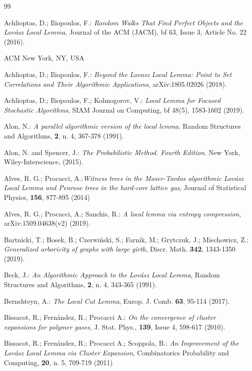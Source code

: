 \documentclass[11pt]{article}
\begin{document}
\begin{thebibliography}{99}


  Achlioptas, D.; Iliopoulos, F.: {\it Random Walks That Find Perfect Objects and the Lovász Local Lemma},
 Journal of the ACM (JACM), {bf 63},  Issue 3, Article No. 22  (2016).

ACM New York, NY, USA


 Achlioptas, D.; Iliopoulos, F.: {\it Beyond the Lovasz Local Lemma: Point to Set Correlations and Their Algorithmic Applications}, arXiv:1805.02026 (2018).

       Achlioptas, D.; Iliopoulos, F.; Kolmogorov, V.: {\it Local Lemma for Focused Stochastic Algorithms},
SIAM Journal on Computing, {bf 48}(5), 1583-1602 (2019).

 Alon, N.: {\it A parallel algorithmic version of the local lemma}. Random Structures and Algorithms,
{\bf 2}, n. 4, 367-378  (1991).

 Alon, N. and Spencer, J.: {\it The Probabilistic Method. Fourth  Edition}. New York, Wiley-Interscience, (2015).


 Alves, R. G.; Procacci, A.:{\it Witness trees in the Moser-Tardos algorithmic Lov\'asz Local Lemma and Penrose trees in the hard-core lattice gas}, Journal of Statistical Physics, {\bf 156}, 877-895 (2014)

 Alves, R. G.; Procacci, A.; Sanchis, R.: \textit{A local lemma via entropy compression}, arXiv:1509.04638(v2) (2019).

 Bartnicki, T.; Bosek, B.; Czerwiński, S.; Farnik, M.; Grytczuk, J.; Miechowicz, Z.: {\it Generalized arboricity of graphs with large girth}, Discr. Math. {\bf 342}, 1343-1350 (2019).

 Beck, J.: {\it An Algorithmic Approach to the Lovász Local Lemma}, Random Structures and Algorithms,
{\bf 2}, n. 4, 343-365 (1991).

 Bernshteyn, A.: {\it The Local Cut Lemma}, Europ. J. Comb. {\bf 63}, 95-114 (2017).


 Bissacot, R.; Fern\'andez, R.; Procacci A.: {\it On the convergence of cluster expansions for polymer gases}, J. Stat. Phys., {\bf 139}, Issue 4, 598-617 (2010).


 Bissacot, R.; Fern\'andez, R.; Procacci A.; Scoppola, B.: {\it An Improvement of the Lov\'asz Local Lemma via Cluster Expansion},
Combinatorics Probability and Computing, {\bf 20}, n. 5, 709-719
(2011)


\end{thebibliography}
\end{document}
